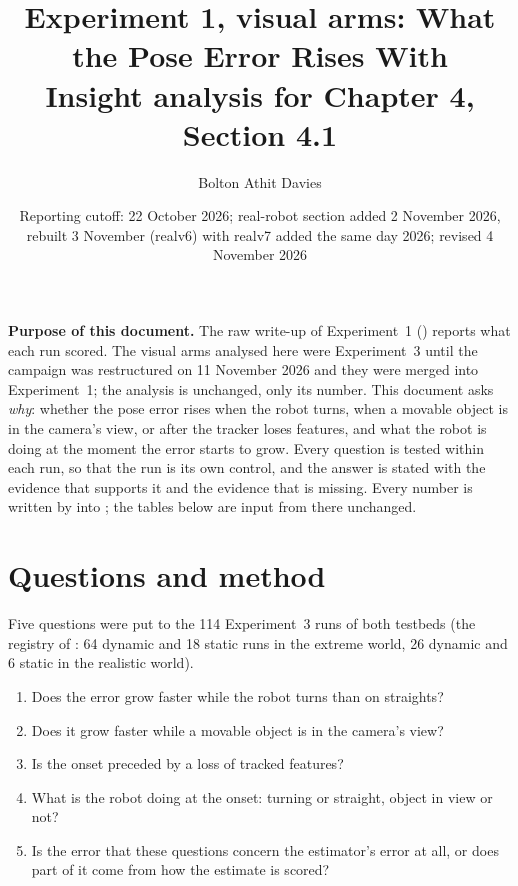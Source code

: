 \documentclass[11pt,a4paper,notitlepage]{report}
\title{Experiment 1, visual arms: What the Pose Error Rises With\\
       \large Insight analysis for Chapter 4, Section 4.1}
\author{Bolton Athit Davies}
\date{Reporting cutoff: 22 October 2026; real-robot section added 2 November 2026, rebuilt 3 November (realv6) with realv7 added the same day 2026; revised 4 November 2026}
\begin{document}
\maketitle

\noindent\textbf{Purpose of this document.} The raw write-up of Experiment~1
() reports what each run scored. The visual arms
analysed here were Experiment~3 until the campaign was restructured on
11 November 2026 and they were merged into Experiment~1; the analysis is
unchanged, only its number. This document asks
\emph{why}: whether the pose error rises when the robot turns, when a movable
object is in the camera's view, or after the tracker loses features, and what
the robot is doing at the moment the error starts to grow. Every question is
tested within each run, so that the run is its own control, and the answer is
stated with the evidence that supports it and the evidence that is missing.
Every number is written by  into
; the tables below are input
from there unchanged.

\section{Questions and method}

Five questions were put to the 114 Experiment~3 runs of both testbeds (the
registry of : 64 dynamic and 18 static
runs in the extreme world, 26 dynamic and 6 static in the realistic world).

\begin{enumerate}[label=Q\arabic*.]
\item Does the error grow faster while the robot turns than on straights?
\item Does it grow faster while a movable object is in the camera's view?
\item Is the onset preceded by a loss of tracked features?
\item What is the robot doing at the onset: turning or straight, object in view
      or not?
\item Is the error that these questions concern the estimator's error at all,
      or does part of it come from how the estimate is scored?
\end{enumerate}
\end{document}
